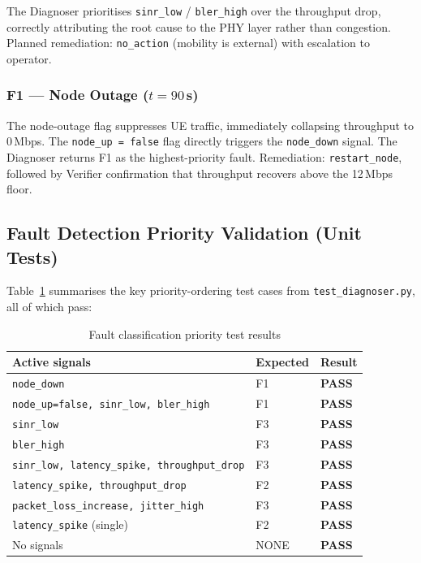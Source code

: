 \documentclass[12pt,a4paper]{article}
\begin{document}
The Diagnoser prioritises \texttt{sinr\_low} / \texttt{bler\_high} over the
throughput drop, correctly attributing the root cause to the PHY layer rather
than congestion. Planned remediation: \texttt{no\_action} (mobility is
external) with escalation to operator.

\subsubsection{F1 — Node Outage ($t = 90$\,s)}

The node-outage flag suppresses UE traffic, immediately collapsing throughput to
0\,Mbps. The \texttt{node\_up = false} flag directly triggers the
\texttt{node\_down} signal. The Diagnoser returns F1 as the highest-priority
fault. Remediation: \texttt{restart\_node}, followed by Verifier confirmation
that throughput recovers above the 12\,Mbps floor.

\subsection{Fault Detection Priority Validation (Unit Tests)}

Table~\ref{tab:priority} summarises the key priority-ordering test cases from
\texttt{test\_diagnoser.py}, all of which pass:

\begin{table}[H]
\centering
\caption{Fault classification priority test results}
\label{tab:priority}
\begin{tabular}{lll}
\toprule
\textbf{Active signals} & \textbf{Expected} & \textbf{Result} \\
\midrule
\texttt{node\_down}                          & F1 & \textbf{PASS} \\
\texttt{node\_up=false, sinr\_low, bler\_high} & F1 & \textbf{PASS} \\
\texttt{sinr\_low}                           & F3 & \textbf{PASS} \\
\texttt{bler\_high}                          & F3 & \textbf{PASS} \\
\texttt{sinr\_low, latency\_spike, throughput\_drop} & F3 & \textbf{PASS} \\
\texttt{latency\_spike, throughput\_drop}    & F2 & \textbf{PASS} \\
\texttt{packet\_loss\_increase, jitter\_high} & F3 & \textbf{PASS} \\
\texttt{latency\_spike} (single)             & F2 & \textbf{PASS} \\
No signals                                   & NONE & \textbf{PASS} \\
\bottomrule
\end{tabular}
\end{table}
\end{document}
